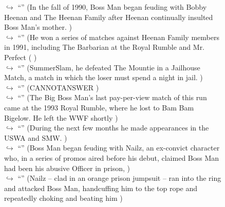 \documentclass[11pt,a4paper, onecolumn]{article}
\begin{document}
\begin{figure}[t] \small \begin{tcolorbox}[boxsep=0pt,left=5pt,right=0pt,top=2pt,colback = yellow!5] \begin{dialogue}
 \small 
\colorbox{pink!25}{$\hookrightarrow$}
{ ``'' (In the fall of 1990, Boss Man began feuding with Bobby Heenan and The Heenan Family after Heenan continually insulted Boss Man's mother. ) }
\\
\colorbox{pink!25}{$\hookrightarrow$}
{ ``'' (He won a series of matches against Heenan Family members in 1991, including The Barbarian at the Royal Rumble and Mr. Perfect ( ) }
\\
\colorbox{pink!25}{$\hookrightarrow$}
{ ``'' (SummerSlam, he defeated The Mountie in a Jailhouse Match, a match in which the loser must spend a night in jail. ) }
\\
\colorbox{pink!25}{$\hookrightarrow$}
{ ``'' (CANNOTANSWER ) }
\\
\colorbox{pink!25}{$\hookrightarrow$}
{ ``'' (The Big Boss Man's last pay-per-view match of this run came at the 1993 Royal Rumble, where he lost to Bam Bam Bigelow. He left the WWF shortly ) }
\\
\colorbox{pink!25}{$\hookrightarrow$}
{ ``'' (During the next few months he made appearances in the USWA and SMW. ) }
\\
\colorbox{pink!25}{$\hookrightarrow$}
{ ``'' (Boss Man began feuding with Nailz, an ex-convict character who, in a series of promos aired before his debut, claimed Boss Man had been his abusive Officer in prison, ) }
\\
\colorbox{pink!25}{$\hookrightarrow$}
{ ``'' (Nailz -- clad in an orange prison jumpsuit -- ran into the ring and attacked Boss Man, handcuffing him to the top rope and repeatedly choking and beating him ) }
\\
 \end{dialogue}\end{tcolorbox}\end{figure}
\end{document}
